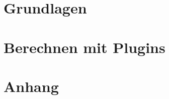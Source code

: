 \documentclass[a4paper,11pt,twoside=false,open=any,headings=standardclasses,
  toc=listof,toc=index,bibliography=totoc]{scrbook}
\title{\produkt}
\subtitle{Benutzerhandbuch \\[1ex] {\normalsize Version \version}}
\author{PhotonPower}
\date{\today}
\begin{document}
\frontmatter
\maketitle
\tableofcontents

\mainmatter
\part{Grundlagen}








\part{Berechnen mit Plugins}








\appendix
\part{Anhang}














\backmatter
\printindex
\end{document}
